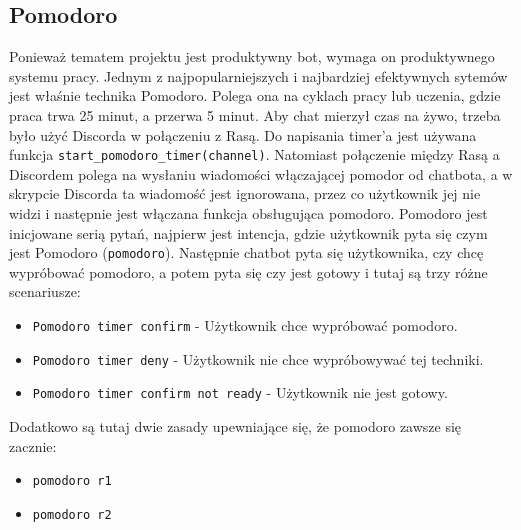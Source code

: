 \documentclass{article}
\begin{document}
\subsection{Pomodoro}
Ponieważ tematem projektu jest produktywny bot, wymaga on produktywnego systemu
pracy. Jednym z najpopularniejszych i najbardziej efektywnych sytemów jest
właśnie technika Pomodoro. Polega ona na cyklach pracy lub uczenia, gdzie praca
trwa 25 minut, a przerwa 5 minut. Aby chat mierzył czas na żywo, trzeba było
użyć Discorda w połączeniu z Rasą. Do napisania timer'a jest używana funkcja
\verb|start_pomodoro_timer(channel)|. Natomiast połączenie między Rasą a
Discordem polega na wysłaniu wiadomości włączającej pomodor od chatbota, a w
skrypcie Discorda ta wiadomość jest ignorowana, przez co użytkownik jej nie
widzi i następnie jest włączana funkcja obsługująca pomodoro. Pomodoro jest
inicjowane serią pytań, najpierw jest intencja, gdzie użytkownik pyta się czym
jest Pomodoro (\verb|pomodoro|). Następnie chatbot pyta się użytkownika, czy
chcę wypróbować pomodoro, a potem pyta się czy jest gotowy i tutaj są trzy
różne scenariusze:
\begin{itemize}
    \item[\textcolor{violet}{\textbullet}] \verb|Pomodoro timer confirm| - Użytkownik chce wypróbować pomodoro.
    \item[\textcolor{violet}{\textbullet}] \verb|Pomodoro timer deny| - Użytkownik nie chce wypróbowywać
        tej techniki.
    \item[\textcolor{violet}{\textbullet}] \verb|Pomodoro timer confirm not ready| - Użytkownik nie jest
        gotowy.
\end{itemize}
Dodatkowo są tutaj dwie zasady upewniające się, że pomodoro zawsze się zacznie:
\begin{itemize}
    \item[\textcolor{violet}{\textbullet}] \verb|pomodoro r1|
    \item[\textcolor{violet}{\textbullet}] \verb|pomodoro r2|
\end{itemize}











\listoffigures
\end{document}
